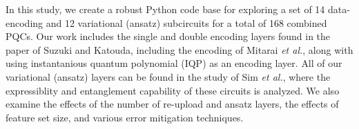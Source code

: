 \documentclass[journal=jacsat,manuscript=article]{achemso}
\begin{document}
In this study, we create a robust Python code base for exploring a set of 14 data-encoding and 12 variational (ansatz) subcircuits for a total of 168 combined PQCs.
Our work includes the single and double encoding layers found in the paper of Suzuki and Katouda\cite{suzuki_predicting_2020}, including the encoding of Mitarai \textit{et al.}\cite{mitarai_quantum_2018}, along with using instantanious quantum polynomial (IQP) as an encoding layer. \cite{bremner_average-case_2016}
All of our variational (ansatz) layers can be found in the study of Sim \textit{et al.}\cite{sim_expressibility_2019}, where the expressiblity and entanglement capability of these circuits is analyzed.
We also examine the effects of the number of re-upload and ansatz layers, the effects of feature set size, and various error mitigation techniques. 







\cite{krenn_artificial_2023}
\end{document}
